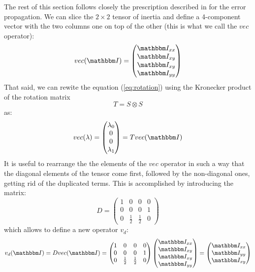 \documentclass[a4paper,11pt]{article}
\newcommand{\itm}{\mathbbm I}
\newcommand{\itc}[1]{\itm_{#1}}
\begin{document}
The rest of this section follows closely the prescription described in
\cite{errors} for the error propagation. We can slice the $2 \times 2$ tensor
of inertia and define a 4-component vector with the two columns one on top 
of the other (this is what we call the $vec$ operator):
\begin{equation}
  vec(\itm) = 
  \begin{pmatrix}
    \itc{xx}\\
    \itc{xy}\\
    \itc{xy}\\
    \itc{yy}
  \end{pmatrix}
\end{equation}
That said, we can rewite the equation (\ref{eq:rotation}) using the
Kronecker product of the rotation matrix
$$
T = S \otimes S
$$
as:
\begin{equation}\label{eq:tensor_transform}
  vec(\lambda) = 
  \begin{pmatrix}
    \lambda_0\\
    0\\
    0\\
    \lambda_1
  \end{pmatrix} = T vec(\itm)
\end{equation}
It is useful to rearrange the the elements of the $vec$ operator in such a way
that the diagonal elements of the tensor come first, followed by the
non-diagonal ones, getting rid of the duplicated terms.
This is accomplished by introducing the matrix:
\begin{equation}
  D = 
  \begin{pmatrix}
    1 & 0 & 0 & 0\\
    0 & 0 & 0 & 1\\
    0 & \frac{1}{2} & \frac{1}{2} & 0
  \end{pmatrix}
\end{equation}
which allows to define a new operator $v_d$:
\begin{equation}
  v_d(\itm) = D vec(\itm) =
  \begin{pmatrix}
    1 & 0 & 0 & 0\\
    0 & 0 & 0 & 1\\
    0 & \frac{1}{2} & \frac{1}{2} & 0
  \end{pmatrix}
  \begin{pmatrix}
    \itc{xx}\\
    \itc{xy}\\
    \itc{xy}\\
    \itc{yy}
  \end{pmatrix} = 
  \begin{pmatrix}
    \itc{xx}\\
    \itc{yy}\\
    \itc{xy}
  \end{pmatrix}
\end{equation}
\end{document}
